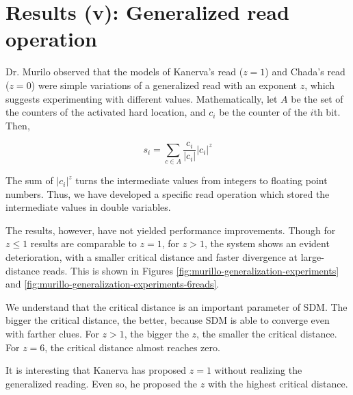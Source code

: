 \chapter{Results (v): Generalized read operation}

Dr. Murilo observed that the models of Kanerva's read ($z=1$) and Chada's read ($z=0$) were simple variations of a generalized read with an exponent $z$, which suggests experimenting with different values. Mathematically, let $A$ be the set of the counters of the activated hard location, and $c_i$ be the counter of the $i$th bit. Then,

$$
s_i = \sum_{c \in A} \frac{c_i}{|c_i|} |c_i|^z
$$

The sum of $|c_i|^z$ turns the intermediate values from integers to floating point numbers. Thus, we have developed a specific read operation which stored the intermediate values in double variables.

The results, however, have not yielded performance improvements. Though for $z \leq 1$ results are comparable to $z=1$, for $z>1$, the system shows an evident deterioration, with a smaller critical distance and faster divergence at large-distance reads. This is shown in Figures \ref{fig:murillo-generalization-experiments} and \ref{fig:murillo-generalization-experiments-6reads}.

We understand that the critical distance is an important parameter of SDM. The bigger the critical distance, the better, because SDM is able to converge even with farther clues. For $z>1$, the bigger the $z$, the smaller the critical distance. For $z = 6$, the critical distance almost reaches zero.

It is interesting that Kanerva has proposed $z=1$ without realizing the generalized reading. Even so, he proposed the $z$ with the highest critical distance.


